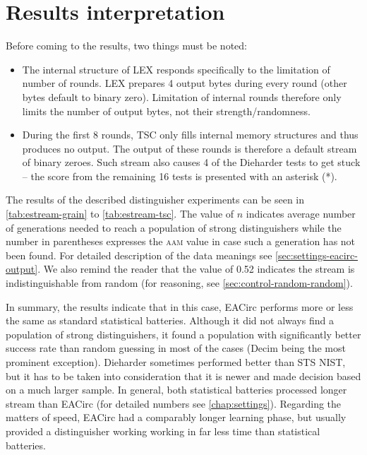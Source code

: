 \documentclass[12pt,oneside]{fithesis2}
\newcommand{\squarebullet}{\textcolor{black}{\raisebox{0.15em}{\rule{4pt}{4pt}}}}
\newenvironment{myItemize}{
  \begin{itemize}[leftmargin=2em,rightmargin=1em,itemsep=\parskip ,parsep=0em,topsep=0em,partopsep=0em]
  \renewcommand{\labelitemi}{\squarebullet}
  \renewcommand{\labelitemii}{$\diamond$}
}{
  \end{itemize}
}
\begin{document}
\section{Results interpretation}
\label{sec:estream-results}

Before coming to the results, two things must be noted:
\begin{myItemize}
\item The internal structure of LEX responds specifically to the limitation of number of rounds.
LEX prepares 4 output bytes during every round (other bytes default to binary zero). 
Limitation of internal rounds therefore only limits the number
of output bytes, not their strength/randomness.
\item During the first 8 rounds, TSC only fills internal memory structures and thus produces no output. The output of these rounds
is therefore a default stream of binary zeroes. Such stream also causes 4 of the Dieharder tests to get stuck --
the score from the remaining 16 tests is presented with an asterisk (*).
\end{myItemize}

\noindent
The results of the described distinguisher experiments can be seen in \autoref{tab:estream-grain} to
\autoref{tab:estream-tsc}. The value of $n$ indicates average number of generations needed to reach a population of
strong distinguishers while the number in parentheses expresses the \textsc{aam} value in case such a generation has not been
found. For detailed description of the data meanings see \autoref{sec:settings-eacirc-output}. We also remind the reader
that the value of 0.52 indicates the stream is indistinguishable from random (for reasoning, see \autoref{sec:control-random-random}).

In summary, the results indicate that in this case, EACirc performs more or less the same as standard statistical batteries.
Although it did not always find a population of strong distinguishers, it found a population with significantly better
success rate than random guessing in most of the cases (Decim being the most prominent exception).
Dieharder sometimes performed better than STS NIST, but it has to be taken into consideration that it is newer
and made decision based on a much larger sample. In general, both statistical batteries processed longer stream than EACirc
(for detailed numbers see \autoref{chap:settings}). Regarding the matters of speed, EACirc had a comparably longer learning phase,
but usually provided a distinguisher working working in far less time than statistical batteries.
\medskip
\end{document}
